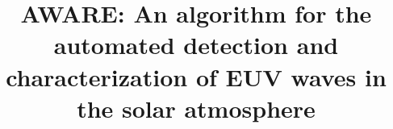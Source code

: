 \documentclass[12pt]{iopart}
\begin{document}
\title{AWARE: An algorithm for the automated detection and characterization
  of EUV waves in the solar atmosphere}





\maketitle













%
{}
\end{document}
